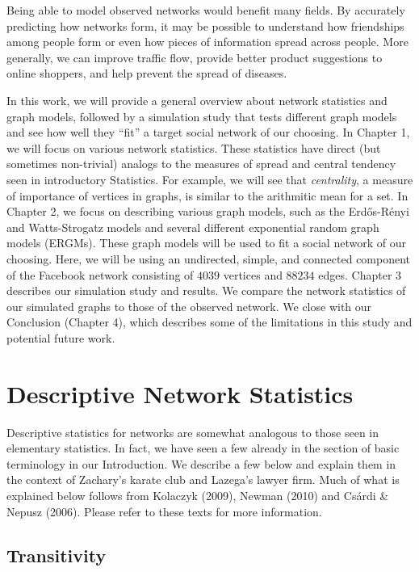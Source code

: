 \documentclass[12pt,twoside]{amherstthesis}
\begin{document}
  Being able to model observed networks would benefit many fields. By
  accurately predicting how networks form, it may be possible to
  understand how friendships among people form or even how pieces of
  information spread across people. More generally, we can improve traffic
  flow, provide better product suggestions to online shoppers, and help
  prevent the spread of diseases.
  
  In this work, we will provide a general overview about network
  statistics and graph models, followed by a simulation study that tests
  different graph models and see how well they ``fit'' a target social
  network of our choosing. In Chapter 1, we will focus on various network
  statistics. These statistics have direct (but sometimes non-trivial)
  analogs to the measures of spread and central tendency seen in
  introductory Statistics. For example, we will see that
  \emph{centrality}, a measure of importance of vertices in graphs, is
  similar to the arithmitic mean for a set. In Chapter 2, we focus on
  describing various graph models, such as the Erdős-Rényi and
  Watts-Strogatz models and several different exponential random graph
  models (ERGMs). These graph models will be used to fit a social network
  of our choosing. Here, we will be using an undirected, simple, and
  connected component of the Facebook network consisting of \(4039\)
  vertices and \(88234\) edges. Chapter 3 describes our simulation study
  and results. We compare the network statistics of our simulated graphs
  to those of the observed network. We close with our Conclusion (Chapter
  4), which describes some of the limitations in this study and potential
  future work.
  
  \chapter{Descriptive Network
  Statistics}\label{descriptive-network-statistics}
  
  Descriptive statistics for networks are somewhat analogous to those seen
  in elementary statistics. In fact, we have seen a few already in the
  section of basic terminology in our Introduction. We describe a few
  below and explain them in the context of Zachary's karate club and
  Lazega's lawyer firm. Much of what is explained below follows from
  Kolaczyk (2009), Newman (2010) and Csárdi \& Nepusz (2006). Please refer
  to these texts for more information.
  
  \section{Transitivity}\label{transitivity}
  
\end{document}
